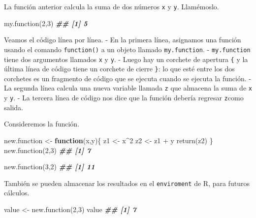\documentclass[
]{book}
\newenvironment{Shaded}{\begin{snugshade}}{\end{snugshade}}
\newcommand{\ControlFlowTok}[1]{\textcolor[rgb]{0.13,0.29,0.53}{\textbf{#1}}}
\newcommand{\DecValTok}[1]{\textcolor[rgb]{0.00,0.00,0.81}{#1}}
\newcommand{\DocumentationTok}[1]{\textcolor[rgb]{0.56,0.35,0.01}{\textbf{\textit{#1}}}}
\newcommand{\FunctionTok}[1]{\textcolor[rgb]{0.00,0.00,0.00}{#1}}
\newcommand{\NormalTok}[1]{#1}
\newcommand{\OtherTok}[1]{\textcolor[rgb]{0.56,0.35,0.01}{#1}}
\newcommand{\SpecialCharTok}[1]{\textcolor[rgb]{0.00,0.00,0.00}{#1}}
\begin{document}
La función anterior calcula la suma de dos números \texttt{x} y \texttt{y}. Llamémoslo.

\begin{Shaded}
\begin{Highlighting}[]
\FunctionTok{my.function}\NormalTok{(}\DecValTok{2}\NormalTok{,}\DecValTok{3}\NormalTok{)}
\DocumentationTok{\#\# [1] 5}
\end{Highlighting}
\end{Shaded}

Veamos el código línea por línea.
- En la primera línea, asignamos una función usando el comando \texttt{function()} a un objeto llamado \texttt{my.function}.
- \texttt{my.function} tiene dos argumentos llamados \texttt{x} y \texttt{y}.
- Luego hay un corchete de apertura \texttt{\{} y la última línea de código tiene un corchete de cierre \texttt{\}}: lo que esté entre los dos corchetes es un fragmento de código que se ejecuta cuando se ejecuta la función.
- La segunda línea calcula una nueva variable llamada \texttt{z} que almacena la suma de \texttt{x} y \texttt{y}.
- La tercera línea de código nos dice que la función debería regresar \texttt{z}como salida.

Consideremos la función.

\begin{Shaded}
\begin{Highlighting}[]
\NormalTok{new.function }\OtherTok{\textless{}{-}} \ControlFlowTok{function}\NormalTok{(x,y)\{}
\NormalTok{  z1 }\OtherTok{\textless{}{-}}\NormalTok{ x}\SpecialCharTok{\^{}}\DecValTok{2}
\NormalTok{  z2 }\OtherTok{\textless{}{-}}\NormalTok{ z1 }\SpecialCharTok{+}\NormalTok{ y}
  \FunctionTok{return}\NormalTok{(z2)}
\NormalTok{\}}
\FunctionTok{new.function}\NormalTok{(}\DecValTok{2}\NormalTok{,}\DecValTok{3}\NormalTok{)}
\DocumentationTok{\#\# [1] 7}

\FunctionTok{new.function}\NormalTok{(}\DecValTok{3}\NormalTok{,}\DecValTok{2}\NormalTok{)}
\DocumentationTok{\#\# [1] 11}
\end{Highlighting}
\end{Shaded}

También se pueden almacenar los resultados en el \texttt{enviroment} de R, para futuros cálculos.

\begin{Shaded}
\begin{Highlighting}[]
\NormalTok{value }\OtherTok{\textless{}{-}} \FunctionTok{new.function}\NormalTok{(}\DecValTok{2}\NormalTok{,}\DecValTok{3}\NormalTok{)}
\NormalTok{value}
\DocumentationTok{\#\# [1] 7}
\end{Highlighting}
\end{Shaded}
\end{document}
